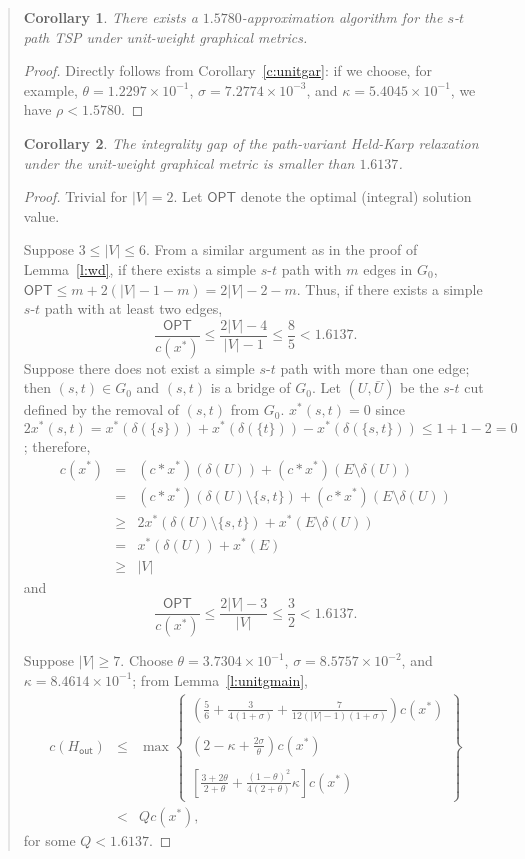 \documentclass[11pt,letterpaper]{article}
\newtheorem{cor}{Corollary}
\newcommand{\st}{\mbox{$s$-$t$} }
\begin{document}
\begin{quote}
\begin{cor}
There exists a $1.5780$-approximation algorithm for the \st path TSP under unit-weight graphical metrics.
\end{cor}
\begin{proof}
Directly follows from Corollary~\ref{c:unitgar}: if we choose, for example, $\theta=1.2297\times 10^{-1}$, $\sigma=7.2774\times 10^{-3}$, and $\kappa=5.4045\times 10^{-1}$, we have $\rho<1.5780$.
\end{proof}

\begin{cor}
The integrality gap of the path-variant Held-Karp relaxation under the unit-weight graphical metric is smaller than $1.6137$.
\end{cor}
\begin{proof}
Trivial for $|V|=2$. Let $\mathsf{OPT}$ denote the optimal (integral) solution value.

Suppose $3\leq |V|\leq 6$. From a similar argument as in the proof of Lemma~\ref{l:wd}, if there exists a simple \st path with $m$ edges in $G_0$, $\mathsf{OPT}\leq m+2(|V|-1-m)=2|V|-2-m$. Thus, if there exists a simple \st path with at least two edges,\[
\frac{\mathsf{OPT}}{c(x^*)}\leq\frac{2|V|-4}{|V|-1}\leq\frac{8}{5} <1.6137
.\]Suppose there does not exist a simple \st path with more than one edge; then $(s,t)\in G_0$ and $(s,t)$ is a bridge of $G_0$. Let $(U,\bar U)$ be the \st cut defined by the removal of $(s,t)$ from $G_0$. $x^*(s,t)=0$ since $2x^*(s,t)=x^*(\delta(\{s\}))+ x^*(\delta(\{t\})) -x^*(\delta(\{s,t\}))\leq 1+1-2=0$; therefore,\begin{eqnarray*}
c(x^*)&=&(c\ast x^*)(\delta(U))+(c\ast x^*)(E\setminus\delta(U))\\
&=&(c\ast x^*)(\delta(U)\setminus\{s,t\})+(c\ast x^*)(E\setminus\delta(U))\\
&\geq&2x^*(\delta(U)\setminus\{s,t\})+x^*(E\setminus\delta(U))\\
&=&x^*(\delta(U))+x^*(E)\\
&\geq&|V|
\end{eqnarray*}and\[
\frac{\mathsf{OPT}}{c(x^*)}\leq\frac{2|V|-3}{|V|}\leq\frac{3}{2} <1.6137
.\]

Suppose $|V|\geq 7$. Choose $\theta=3.7304\times 10^{-1}$, $\sigma=8.5757\times 10^{-2}$, and $\kappa=8.4614\times 10^{-1}$; from Lemma~\ref{l:unitgmain},\begin{eqnarray*}
c(H_{\mathsf{out}})&\leq& \max\left\{
\begin{array}{l}
\displaystyle \left( \frac{5}{6}+\frac{3}{4(1+\sigma)} +\frac{7}{12(|V|-1)(1+\sigma)} \right) c(x^*)\\
\\
\displaystyle \left( 2-\kappa+\frac{2\sigma}{\theta} \right) c(x^*)\\
\\
\displaystyle \left[ \frac{3+2\theta}{2+\theta} + \frac{(1-\theta)^2}{4(2+\theta)} \kappa \right] c(x^*)
\end{array}
\right\}\\
&<&Qc(x^*)
,\end{eqnarray*}for some $Q<1.6137$.
\end{proof}


\end{quote}
\end{document}
